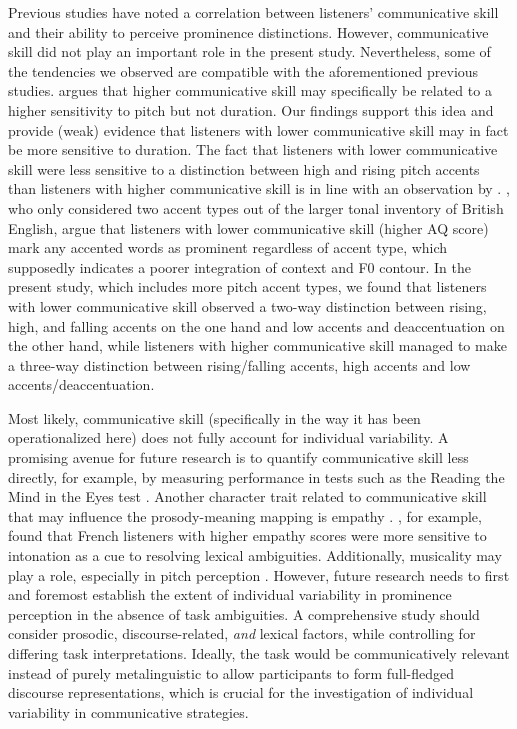 Previous studies \citep[e.g.,][]{bishopPhonologyPhoneticsSignalextrinsic2020, orricoInfluenceEmpathyAutisticlike2023} have noted a correlation between listeners' communicative skill and their ability to perceive prominence distinctions. However, communicative skill did not play an important role in the present study. Nevertheless, some of the tendencies we observed are compatible with the aforementioned previous studies. \citet{bishopIndividualDifferencesTopdown2016} argues that higher communicative skill may specifically be related to a higher sensitivity to pitch but not duration. Our findings support this idea and provide (weak) evidence that listeners with lower communicative skill may in fact be more sensitive to duration. The fact that listeners with lower communicative skill were less sensitive to a distinction between high and rising pitch accents than listeners with higher communicative skill is in line with an observation by \citet{orricoInfluenceEmpathyAutisticlike2023}. \citet{orricoInfluenceEmpathyAutisticlike2023}, who only considered two accent types out of the larger tonal inventory of British English, argue that listeners with lower communicative skill (higher AQ score) mark any accented words as prominent regardless of accent type, which supposedly indicates a poorer integration of context and F0 contour. In the present study, which includes more pitch accent types, we found that listeners with lower communicative skill observed a two-way distinction between rising, high, and falling accents on the one hand and low accents and deaccentuation on the other hand, while listeners with higher communicative skill managed to make a three-way distinction between rising/falling accents, high accents and low accents/deaccentuation.

Most likely, communicative skill (specifically in the way it has been operationalized here) does not fully account for individual variability. A promising avenue for future research is to quantify communicative skill less directly, for example, by measuring performance in tests such as the Reading the Mind in the Eyes test \citep[e.g.,][]{turnbullListenerorientedPhoneticReduction2019}. Another character trait related to communicative skill that may influence the prosody-meaning mapping is empathy \citep[e.g.,][]{esteve-gibertEmpathyInfluencesHow2020, orricoInfluenceEmpathyAutisticlike2023}. \citet{esteve-gibertEmpathyInfluencesHow2020}, for example, found that French listeners with higher empathy scores were more sensitive to intonation as a cue to resolving lexical ambiguities. Additionally, musicality may play a role, especially in pitch perception \citep{schonMusicSpeechMusic2004}. However, future research needs to first and foremost establish the extent of individual variability in prominence perception in the absence of task ambiguities. A comprehensive study should consider prosodic, discourse-related, \textit{and} lexical factors, while controlling for differing task interpretations. Ideally, the task would be communicatively relevant instead of purely metalinguistic to allow participants to form full-fledged discourse representations, which is crucial for the investigation of individual variability in communicative strategies.

